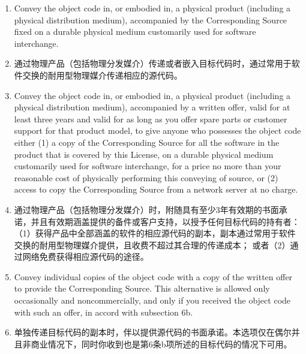 \documentclass[11pt]{article}
\begin{document}
\begin{enumerate}
        \begin{enumerate}
          \item Convey the object code in, or embodied in, a physical product
                (including a physical distribution medium), accompanied by the
                Corresponding Source fixed on a durable physical medium
                customarily used for software interchange.

          \item 通过物理产品（包括物理分发媒介）传递或者嵌入目标代码时，通过常用于软件交换的耐用型物理媒介传递相应的源代码。

          \item Convey the object code in, or embodied in, a physical product
                (including a physical distribution medium), accompanied by a
                written offer, valid for at least three years and valid for as
                long as you offer spare parts or customer support for that product
                model, to give anyone who possesses the object code either (1) a
                copy of the Corresponding Source for all the software in the
                product that is covered by this License, on a durable physical
                medium customarily used for software interchange, for a price no
                more than your reasonable cost of physically performing this
                conveying of source, or (2) access to copy the
                Corresponding Source from a network server at no charge.

          \item 通过物理产品（包括物理分发媒介）时，附随具有至少3年有效期的书面承诺，并且有效期涵盖提供的备件或客户支持，以授予任何目标代码的持有者：
                （1）获得产品中全部涵盖的软件的相应源代码的副本，副本通过常用于软件交换的耐用型物理媒介提供，且收费不超过其合理的传递成本；
                或者（2）通过网络免费获得相应源代码的途径。

          \item Convey individual copies of the object code with a copy of the
                written offer to provide the Corresponding Source.  This
                alternative is allowed only occasionally and noncommercially, and
                only if you received the object code with such an offer, in accord
                with subsection 6b.

          \item 单独传递目标代码的副本时，伴以提供源代码的书面承诺。本选项仅在偶尔并且非商业情况下，同时你收到也是第6条b项所述的目标代码的情况下可用。


\end{enumerate}
\end{enumerate}
\end{document}
